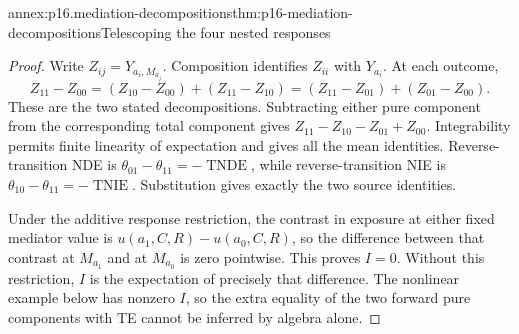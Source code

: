 \begin{annexitem}{annex:p16.mediation-decompositions}{thm:p16-mediation-decompositions}{Telescoping the four nested responses}
\begin{proof}
Write \(Z_{ij}=Y_{a_i,M_{a_j}}\). Composition identifies \(Z_{ii}\)
with \(Y_{a_i}\). At each outcome,
\[
 Z_{11}-Z_{00}=(Z_{10}-Z_{00})+(Z_{11}-Z_{10})
             =(Z_{11}-Z_{01})+(Z_{01}-Z_{00}).
\]
These are the two stated decompositions. Subtracting either pure
component from the corresponding total component gives
\(Z_{11}-Z_{10}-Z_{01}+Z_{00}\). Integrability permits finite linearity
of expectation and gives all the mean identities. Reverse-transition
NDE is \(\theta_{01}-\theta_{11}=-\operatorname{TNDE}\), while
reverse-transition NIE is \(\theta_{10}-\theta_{11}=-\operatorname{TNIE}\).
Substitution gives exactly the two source identities.

Under the additive response restriction, the contrast in exposure at
either fixed mediator value is \(u(a_1,C,R)-u(a_0,C,R)\), so
the difference between that contrast at \(M_{a_1}\) and at \(M_{a_0}\)
is zero pointwise. This proves \(I=0\). Without this restriction,
\(I\) is the expectation of precisely that difference. The nonlinear
example below has nonzero \(I\), so the extra equality of the two
forward pure components with TE cannot be inferred by algebra alone.
\end{proof}
\end{annexitem}

